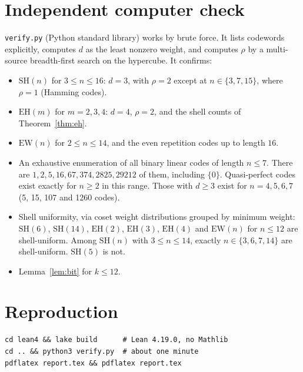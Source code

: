 \documentclass[11pt]{article}
\theoremstyle{definition}
\theoremstyle{remark}
\begin{document}
\section{Independent computer check}
\texttt{verify.py} (Python standard library) works by brute force. It lists
codewords explicitly, computes $d$ as the least nonzero weight, and computes
$\rho$ by a multi-source breadth-first search on the hypercube. It confirms:
\begin{itemize}
\item $\mathrm{SH}(n)$ for $3\le n\le 16$: $d=3$, with $\rho=2$ except at
$n\in\{3,7,15\}$, where $\rho=1$ (Hamming codes).
\item $\mathrm{EH}(m)$ for $m=2,3,4$: $d=4$, $\rho=2$, and the shell counts
of Theorem~\ref{thm:eh}.
\item $\mathrm{EW}(n)$ for $2\le n\le 14$, and the even repetition codes up to
length $16$.
\item An exhaustive enumeration of all binary linear codes of length $n\le 7$.
There are $1, 2, 5, 16, 67, 374, 2825, 29212$ of them, including $\{0\}$.
Quasi-perfect codes exist exactly for $n\ge 2$ in this range. Those with
$d\ge3$ exist for $n=4,5,6,7$ (5, 15, 107 and 1260 codes).
\item Shell uniformity, via coset weight distributions grouped by minimum
weight: $\mathrm{SH}(6)$, $\mathrm{SH}(14)$, $\mathrm{EH}(2)$,
$\mathrm{EH}(3)$, $\mathrm{EH}(4)$ and $\mathrm{EW}(n)$ for $n\le 12$ are
shell-uniform. Among $\mathrm{SH}(n)$ with $3\le n\le 14$, exactly
$n\in\{3,6,7,14\}$ are shell-uniform. $\mathrm{SH}(5)$ is not.
\item Lemma~\ref{lem:bit} for $k\le 12$.
\end{itemize}

\section{Reproduction}
\begin{verbatim}
cd lean4 && lake build      # Lean 4.19.0, no Mathlib
cd .. && python3 verify.py  # about one minute
pdflatex report.tex && pdflatex report.tex
\end{verbatim}
\end{document}
